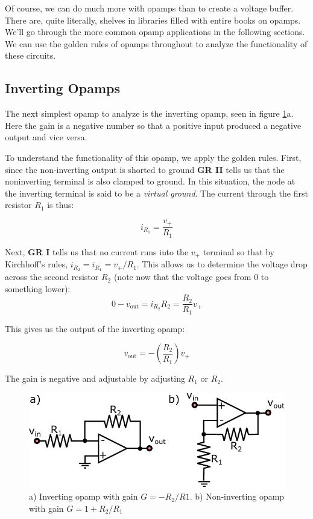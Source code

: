 \documentclass{tufte-book}
\begin{document}
Of course, we can do much more with opamps than to create a voltage buffer. There are, quite literally, shelves in libraries filled with entire books on opamps. We'll go through the more common opamp applications in the following sections. We can use the golden rules of opamps throughout to analyze the functionality of these circuits.

\subsection{Inverting Opamps}
The next simplest opamp to analyze is the inverting opamp, seen in figure \ref{fig:inv_noninv_opamps}a. Here the gain is a negative number so that a positive input produced a negative output and vice versa. 

To understand the functionality of this opamp, we apply the golden rules. First, since the non-inverting output is shorted to ground \textbf{GR II} tells us that the noninverting terminal is also clamped to ground. In this situation, the node at the inverting terminal is said to be a \textit{virtual ground}. The current through the first resistor $R_1$ is thus:

\begin{equation}
\label{eq:inverting_opamp_deriv_1}
i_{R_1} = \frac{v_+}{R_1}
\end{equation}

Next, \textbf{GR I} tells us that no current runs into the $v_+$ terminal so that by Kirchhoff's rules, $i_{R_2} = i_{R_1} = v_+/R_1$. This allows us to determine the voltage drop across the second resistor $R_2$ (note now that the voltage goes from 0 to something lower):
\begin{equation}
\label{eq:inverting_opamp_deriv_2}
0-v_\text{out} = i_{R_2}R_2 = \frac{R_2}{R_1}v_+
\end{equation}

This gives us the output of the inverting opamp:

\begin{equation}
\label{eq:inverting_opamp}
v_\text{out} = -\left(\frac{R_2}{R_1}\right)v_+
\end{equation}

The gain is negative and adjustable by adjusting $R_1$ or $R_2$.

\begin{figure}[ht]
\caption{a) Inverting opamp with gain $G=-R_2/R1$. b) Non-inverting opamp with gain $G = 1+R_2/R_1$}
\label{fig:inv_noninv_opamps}
	\begin{center}
		\includegraphics[]{Images/inv_noninv_opamps.pdf}
	\end{center}
\end{figure}
\end{document}

